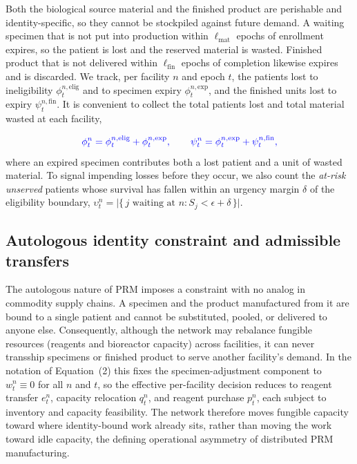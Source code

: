 \documentclass[preprint,review,12pt,nonatbib]{elsarticle}
\providecommand{\DIFadd}[1]{{\protect\color{blue}#1}} %
\begin{document}
\DIFadd{Both the biological source material and the finished product are perishable and identity-specific, so they cannot be stockpiled against future demand. A waiting specimen that is not put into production within $\ell_{\mathrm{mat}}$ epochs of enrollment expires, so the patient is lost and the reserved material is wasted. Finished product that is not delivered within $\ell_{\mathrm{fin}}$ epochs of completion likewise expires and is discarded. We track, per facility $n$ and epoch $t$, the patients lost to ineligibility $\phi^{n,\mathrm{elig}}_t$ and to specimen expiry $\phi^{n,\mathrm{exp}}_t$, and the finished units lost to expiry $\psi^{n,\mathrm{fin}}_t$. It is convenient to collect the total patients lost and total material wasted at each facility,
}

\begin{equation}
\DIFadd{\label{eq:loss-aggregates}
\phi^{n}_t = \phi^{n,\mathrm{elig}}_t + \phi^{n,\mathrm{exp}}_t,
\qquad
\psi^{n}_t = \phi^{n,\mathrm{exp}}_t + \psi^{n,\mathrm{fin}}_t,
}\end{equation}
\DIFadd{where an expired specimen contributes both a lost patient and a unit of wasted material. To signal impending losses before they occur, we also count the }\emph{\DIFadd{at-risk unserved}} \DIFadd{patients whose survival has fallen within an urgency margin $\delta$ of the eligibility boundary, $\upsilon^{n}_t = \big|\{\, j \text{ waiting at } n : S_j < \epsilon + \delta \,\}\big|$.
}

\subsection{\DIFadd{Autologous identity constraint and admissible transfers}}
\label{sec:problem-identity}

\DIFadd{The autologous nature of PRM imposes a constraint with no analog in commodity supply chains. A specimen and the product manufactured from it are bound to a single patient and cannot be substituted, pooled, or delivered to anyone else. Consequently, although the network may rebalance fungible resources (reagents and bioreactor capacity) across facilities, it can never transship specimens or finished product to serve another facility's demand. In the notation of Equation~(2) this fixes the specimen-adjustment component to $w^n_t \equiv 0$ for all $n$ and $t$, so the effective per-facility decision reduces to reagent transfer $e^n_t$, capacity relocation $q^n_t$, and reagent purchase $p^n_t$, each subject to inventory and capacity feasibility. The network therefore moves fungible capacity toward where identity-bound work already sits, rather than moving the work toward idle capacity, the defining operational asymmetry of distributed PRM manufacturing.
}
\end{document}
